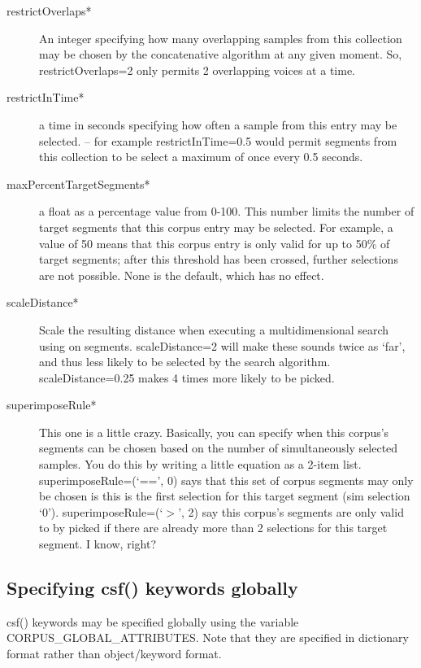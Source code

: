 \documentclass{article}
\begin{document}
\begin{spacing}{1.2}
\begin{description}
\item[restrictOverlaps*] An integer specifying how many overlapping samples from this collection may be chosen by the concatenative algorithm at any given moment.  So, restrictOverlaps=2 only permits 2 overlapping voices at a time.

\item[restrictInTime*] a time in seconds specifying how often a sample from this entry may be selected. -- for example restrictInTime=0.5 would permit segments from this collection to be select a maximum of once every 0.5 seconds.

\item[maxPercentTargetSegments*] a float as a percentage value from 0-100.  This number limits the number of target segments that this corpus entry may be selected.  For example, a value of 50 means that this corpus entry is only valid for up to 50\% of target segments; after this threshold has been crossed, further selections are not possible.  None is the default, which has no effect.



\item[scaleDistance*] Scale the resulting distance when executing a multidimensional search using on segments.  scaleDistance=2 will make these sounds twice as `far', and thus less likely to be selected by the search algorithm.  scaleDistance=0.25 makes 4 times more likely to be picked.

\item[superimposeRule*]  This one is a little crazy.  Basically, you can specify when this corpus's segments can be chosen based on the number of simultaneously selected samples.  You do this by writing a little equation as a 2-item list.  superimposeRule=(`==', 0) says that this set of corpus segments may only be chosen is this is the first selection for this target segment (sim selection `0').  superimposeRule=(`$>$', 2) say this corpus's segments are only valid to by picked if there are already more than 2 selections for this target segment.  I know, right?
\end{description}


\subsection{Specifying csf() keywords globally}\label{globalcorpus}
csf() keywords may be specified globally using the variable CORPUS\_GLOBAL\_ATTRIBUTES.  Note that they are specified in dictionary format rather than object/keyword format.


\end{spacing}
\end{document}
